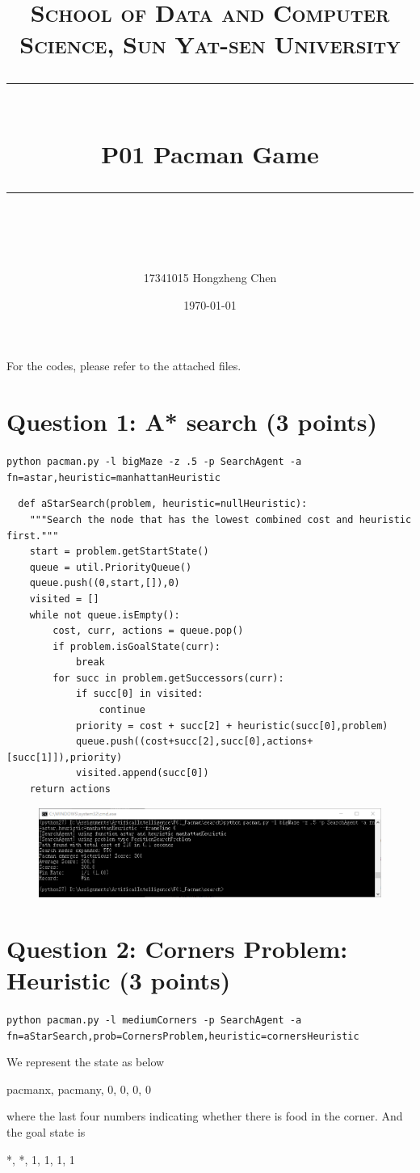 \documentclass[a4paper, 11pt]{article}
\title{
\normalfont \normalsize
\textsc{School of Data and Computer Science, Sun Yat-sen University} \\ [25pt] %
\rule{\textwidth}{0.5pt} \\[0.4cm] %
\huge  P01 Pacman Game \\ %
\rule{\textwidth}{2pt} \\[0.5cm] %
\author{17341015 Hongzheng Chen}
\date{\normalsize\today}
}
\begin{document}
\maketitle
\tableofcontents
\newpage

For the codes, please refer to the attached files.

\section{Question 1: A* search (3 points)}
\texttt{python pacman.py -l bigMaze -z .5 -p SearchAgent -a fn=astar,heuristic=manhattanHeuristic}

\begin{lstlisting}
  def aStarSearch(problem, heuristic=nullHeuristic):
    """Search the node that has the lowest combined cost and heuristic first."""
    start = problem.getStartState()
    queue = util.PriorityQueue()
    queue.push((0,start,[]),0)
    visited = []
    while not queue.isEmpty():
        cost, curr, actions = queue.pop()
        if problem.isGoalState(curr):
            break
        for succ in problem.getSuccessors(curr):
            if succ[0] in visited:
                continue
            priority = cost + succ[2] + heuristic(succ[0],problem)
            queue.push((cost+succ[2],succ[0],actions+[succ[1]]),priority)
            visited.append(succ[0])
    return actions
\end{lstlisting}

\begin{figure}[H]
  \centering
  \includegraphics[width=\linewidth]{fig/Q1.png}
\end{figure}

\section{Question 2: Corners Problem: Heuristic (3 points)}
\texttt{python pacman.py -l mediumCorners -p SearchAgent -a fn=aStarSearch,prob=CornersProblem,heuristic=cornersHeuristic}

We represent the state as below
\begin{center}
  pacmanx, pacmany, 0, 0, 0, 0
\end{center}
where the last four numbers indicating whether there is food in the corner.
And the goal state is
\begin{center}
  *, *, 1, 1, 1, 1
\end{center}
\end{document}
